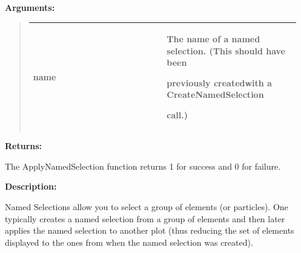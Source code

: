 \documentclass[letterpaper,10pt,english]{sphinxmanual}
\begin{document}
\begin{DUlineblock}{0em}
\item[] 
\item[] \textbf{Arguments:}
\end{DUlineblock}
\begin{quote}

\begin{tabular}{|p{0.475\linewidth}|p{0.475\linewidth}|}
\hline

name
 & 
\begin{DUlineblock}{0em}
\item[] The name of a named selection. (This should have been
\item[] previously createdwith a CreateNamedSelection
\item[] call.)
\end{DUlineblock}
\\
\hline\end{tabular}

\end{quote}

\begin{DUlineblock}{0em}
\item[] 
\item[] \textbf{Returns:}
\item[] The ApplyNamedSelection function returns 1 for success and 0 for failure.
\item[] 
\item[] \textbf{Description:}
\item[] Named Selections allow you to select a group of elements (or particles).
One typically creates a named selection from a group of elements and then
later applies the named selection to another plot (thus reducing the
set of elements displayed to the ones from when the named selection was
created).
\end{DUlineblock}

\begin{DUlineblock}{0em}
\item[] 
\end{DUlineblock}
\end{document}
